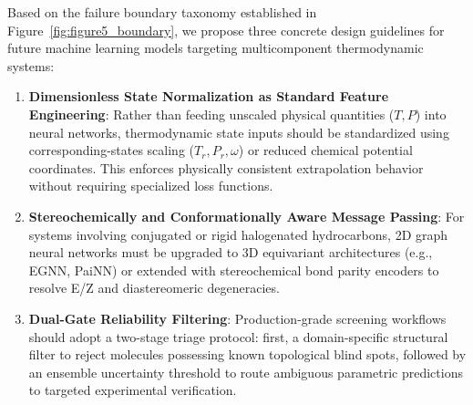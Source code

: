 Based on the failure boundary taxonomy established in Figure~\ref{fig:figure5_boundary}, we propose three concrete design guidelines for future machine learning models targeting multicomponent thermodynamic systems:
\begin{enumerate}
    \item \textbf{Dimensionless State Normalization as Standard Feature Engineering}: Rather than feeding unscaled physical quantities ($T, P$) into neural networks, thermodynamic state inputs should be standardized using corresponding-states scaling ($T_r, P_r, \omega$) or reduced chemical potential coordinates. This enforces physically consistent extrapolation behavior without requiring specialized loss functions.
    \item \textbf{Stereochemically and Conformationally Aware Message Passing}: For systems involving conjugated or rigid halogenated hydrocarbons, 2D graph neural networks must be upgraded to 3D equivariant architectures (e.g., EGNN, PaiNN) or extended with stereochemical bond parity encoders to resolve E/Z and diastereomeric degeneracies.
    \item \textbf{Dual-Gate Reliability Filtering}: Production-grade screening workflows should adopt a two-stage triage protocol: first, a domain-specific structural filter to reject molecules possessing known topological blind spots, followed by an ensemble uncertainty threshold to route ambiguous parametric predictions to targeted experimental verification.
\end{enumerate}
